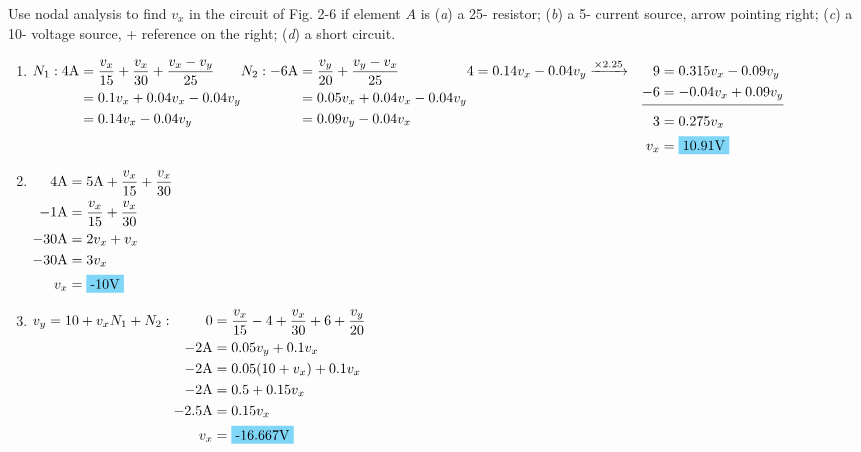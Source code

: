 Use nodal analysis to find $v_x$ in the circuit of Fig. 2-6 if element $A$ is (\emph{a}) a 25-\qw{\ohm} resistor; (\emph{b}) a 5-\qw{\A} current source, arrow pointing right; (\emph{c}) a 10-\qw{\V} voltage source, + reference on the right; (\emph{d}) a short circuit.

\begin{enumerate}[leftmargin=2cm,labelsep=.5cm,label=\bfseries\alph*)]
	\item $ N_1: \\
	\begin{aligned}[t]
	4\qw{\A} &= \frac{v_x}{15}+\frac{v_x}{30}+\frac{v_x-v_y}{25} \\
	&= 0.1v_x+0.04v_x-0.04v_y \\
	&= 0.14v_x-0.04v_y
	\end{aligned} 
	\\[5mm]
	N_2: \\
	\begin{aligned}[t]
	-6\qw{\A} &= \frac{v_y}{20}+\frac{v_y-v_x}{25} \\
	&= 0.05v_x+0.04v_x-0.04v_y \\
	&= 0.09v_y-0.04v_x
	\end{aligned} 
	\\[5mm]
	\begin{aligned}[t]
	4=0.14v_x-0.04v_y &\xrightarrow{\times 2.25} & 9 &= 0.315v_x-0.09v_y \\
	& & -6 &= -0.04v_x+0.09v_y \\[-3mm]
	\cline{3-4}
	& & 3&= 0.275v_x \\
	& & v_x &= \hlbox{10.91\qw{\V}}
	\end{aligned} $
	\\[1cm]
	
	\item $
	\begin{aligned}[t]
	4\qw{\A} &= 5\qw{\A}+\frac{v_x}{15}+\frac{v_x}{30} \\
	-1\qw{\A} &= \frac{v_x}{15}+\frac{v_x}{30} \\
	-30\qw{\A} &= 2v_x+v_x \\
	-30\qw{\A} &= 3v_x \\
	v_x &= \hlbox{-10\qw{\V}}
	\end{aligned} $
	\\[1cm]
	
	\item $
	\begin{aligned}[t]
	v_y &= 10+v_x \\
	\end{aligned} 
	\\[5mm]
	N_1+N_2: \\
	\begin{aligned}[t]
	0 &= \frac{v_x}{15}-4+\frac{v_x}{30}+6+\frac{v_y}{20} \\
	-2\qw{\A} &= 0.05v_y+0.1v_x \\
	-2\qw{\A} &= 0.05(10+v_x)+0.1v_x \\
	-2\qw{\A} &= 0.5+0.15v_x \\
	-2.5\qw{\A} &= 0.15v_x \\
	v_x &= \hlbox{-16.667\qw{\V}}
	\end{aligned} $
	\\[1cm]
	

\end{enumerate}
